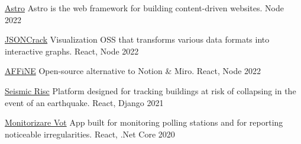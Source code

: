 



\begin{cvhonors}

  \cvhonor
    {\href{https://github.com/withastro/astro}{Astro}} %
    {Astro is the web framework for building content-driven websites.} %
    {Node} %
    {2022} %

  \cvhonor
    {\href{https://github.com/AykutSarac/jsoncrack.com}{JSONCrack}} %
    {Visualization OSS that transforms various data formats into interactive graphs.} %
    {React, Node} %
    {2022} %

  \cvhonor
    {\href{https://github.com/toeverything/AFFiNE}{AFFiNE}} %
    {Open-source alternative to Notion \& Miro.} %
    {React, Node} %
    {2022} %

  \cvhonor
    {\href{https://github.com/code4romania/seismic-risc}{Seismic Risc}} %
    {Platform designed for tracking buildings at risk of collapsing in the event of an earthquake.} %
    {React, Django} %
    {2021} %

  \cvhonor
    {\href{https://github.com/code4romania/monitorizare-vot}{Monitorizare Vot}} %
    {App built for monitoring polling stations and for reporting noticeable irregularities.} %
    {React, .Net Core} %
    {2020} %

\end{cvhonors}


